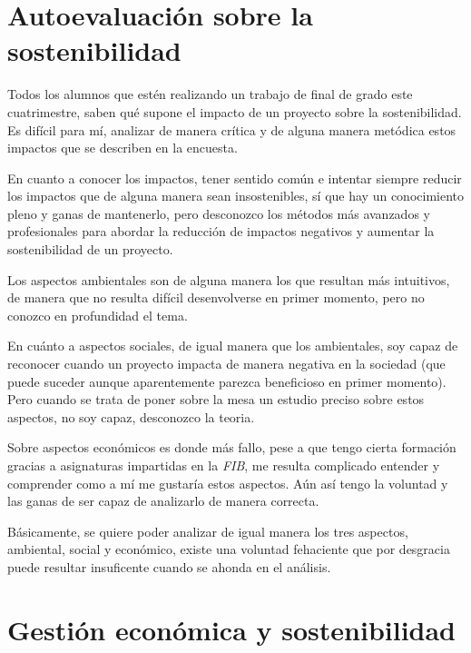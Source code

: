 \section{Autoevaluación sobre la sostenibilidad}

Todos los alumnos que estén realizando un trabajo de final de grado este cuatrimestre, saben qué supone el impacto de un proyecto sobre la sostenibilidad. Es difícil para mí, analizar de manera crítica y de alguna manera metódica estos impactos que se describen en la encuesta. 
\par\medskip
En cuanto a conocer los impactos, tener sentido común e intentar siempre reducir los impactos que de alguna manera sean insostenibles, sí que hay un conocimiento pleno y ganas de mantenerlo, pero desconozco los métodos más avanzados y profesionales para abordar la reducción de impactos negativos y aumentar la sostenibilidad de un proyecto.
\par\medskip
Los aspectos ambientales son de alguna manera los que resultan más intuitivos, de manera que no resulta difícil desenvolverse en primer momento, pero no conozco en profundidad el tema.
\par\medskip
En cuánto a aspectos sociales, de igual manera que los ambientales, soy capaz de reconocer cuando un proyecto impacta de manera negativa en la sociedad (que puede suceder aunque aparentemente parezca beneficioso en primer momento). Pero cuando se trata de poner sobre la mesa un estudio preciso sobre estos aspectos, no soy capaz, desconozco la teoria.
\par\medskip
Sobre aspectos económicos es donde más fallo, pese a que tengo cierta formación gracias a asignaturas impartidas en la \textit{FIB}, me resulta complicado entender y comprender como a mí me gustaría estos aspectos. Aún así tengo la voluntad y las ganas de ser capaz de analizarlo de manera correcta.
\par\medskip
Básicamente, se quiere poder analizar de igual manera los tres aspectos, ambiental, social y económico, existe una voluntad fehaciente que por desgracia puede resultar insuficente cuando se ahonda en el análisis.

\section{Gestión económica y sostenibilidad}



